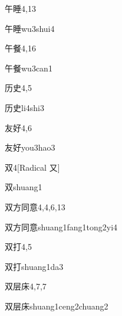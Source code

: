 \begin{entry}{午睡}{4,13}
  \begin{phonetics}{午睡}{wu3shui4}
  \end{phonetics}
\end{entry}

\begin{entry}{午餐}{4,16}
  \begin{phonetics}{午餐}{wu3can1}
  \end{phonetics}
\end{entry}

\begin{entry}{历史}{4,5}
  \begin{phonetics}{历史}{li4shi3}
  \end{phonetics}
\end{entry}

\begin{entry}{友好}{4,6}
  \begin{phonetics}{友好}{you3hao3}
  \end{phonetics}
\end{entry}

\begin{entry}{双}{4}[Radical 又]
  \begin{phonetics}{双}{shuang1}
  \end{phonetics}
\end{entry}

\begin{entry}{双方同意}{4,4,6,13}
  \begin{phonetics}{双方同意}{shuang1fang1tong2yi4}
  \end{phonetics}
\end{entry}

\begin{entry}{双打}{4,5}
  \begin{phonetics}{双打}{shuang1da3}
  \end{phonetics}
\end{entry}

\begin{entry}{双层床}{4,7,7}
  \begin{phonetics}{双层床}{shuang1ceng2chuang2}
  \end{phonetics}
\end{entry}

